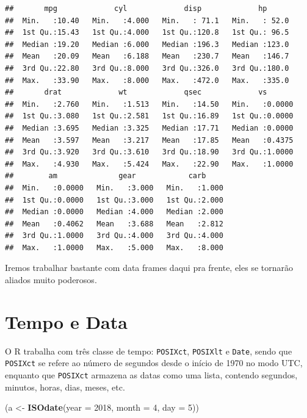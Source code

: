 \documentclass[]{book}
\newenvironment{Shaded}{\begin{snugshade}}{\end{snugshade}}
\newcommand{\KeywordTok}[1]{\textcolor[rgb]{0.13,0.29,0.53}{\textbf{#1}}}
\newcommand{\DataTypeTok}[1]{\textcolor[rgb]{0.13,0.29,0.53}{#1}}
\newcommand{\DecValTok}[1]{\textcolor[rgb]{0.00,0.00,0.81}{#1}}
\newcommand{\StringTok}[1]{\textcolor[rgb]{0.31,0.60,0.02}{#1}}
\newcommand{\NormalTok}[1]{#1}
\theoremstyle{definition}
\theoremstyle{definition}
\theoremstyle{definition}
\theoremstyle{remark}
\begin{document}
\begin{verbatim}
##       mpg             cyl             disp             hp       
##  Min.   :10.40   Min.   :4.000   Min.   : 71.1   Min.   : 52.0  
##  1st Qu.:15.43   1st Qu.:4.000   1st Qu.:120.8   1st Qu.: 96.5  
##  Median :19.20   Median :6.000   Median :196.3   Median :123.0  
##  Mean   :20.09   Mean   :6.188   Mean   :230.7   Mean   :146.7  
##  3rd Qu.:22.80   3rd Qu.:8.000   3rd Qu.:326.0   3rd Qu.:180.0  
##  Max.   :33.90   Max.   :8.000   Max.   :472.0   Max.   :335.0  
##       drat             wt             qsec             vs        
##  Min.   :2.760   Min.   :1.513   Min.   :14.50   Min.   :0.0000  
##  1st Qu.:3.080   1st Qu.:2.581   1st Qu.:16.89   1st Qu.:0.0000  
##  Median :3.695   Median :3.325   Median :17.71   Median :0.0000  
##  Mean   :3.597   Mean   :3.217   Mean   :17.85   Mean   :0.4375  
##  3rd Qu.:3.920   3rd Qu.:3.610   3rd Qu.:18.90   3rd Qu.:1.0000  
##  Max.   :4.930   Max.   :5.424   Max.   :22.90   Max.   :1.0000  
##        am              gear            carb      
##  Min.   :0.0000   Min.   :3.000   Min.   :1.000  
##  1st Qu.:0.0000   1st Qu.:3.000   1st Qu.:2.000  
##  Median :0.0000   Median :4.000   Median :2.000  
##  Mean   :0.4062   Mean   :3.688   Mean   :2.812  
##  3rd Qu.:1.0000   3rd Qu.:4.000   3rd Qu.:4.000  
##  Max.   :1.0000   Max.   :5.000   Max.   :8.000
\end{verbatim}

Iremos trabalhar bastante com data frames daqui pra frente, eles se
tornarão aliados muito poderosos.

\section{Tempo e Data}\label{tempo-e-data}

O R trabalha com três classe de tempo: \texttt{POSIXct},
\texttt{POSIXlt} e \texttt{Date}, sendo que \texttt{POSIXct} se refere
ao número de segundos desde o início de 1970 no modo UTC, enquanto que
\texttt{POSIXct} armazena as datas como uma lista, contendo segundos,
minutos, horas, dias, meses, etc.

\begin{Shaded}
\begin{Highlighting}[]
\NormalTok{(a <-}\StringTok{ }\KeywordTok{ISOdate}\NormalTok{(}\DataTypeTok{year =} \DecValTok{2018}\NormalTok{, }\DataTypeTok{month =} \DecValTok{4}\NormalTok{, }\DataTypeTok{day =} \DecValTok{5}\NormalTok{))}
\end{Highlighting}
\end{Shaded}
\end{document}
